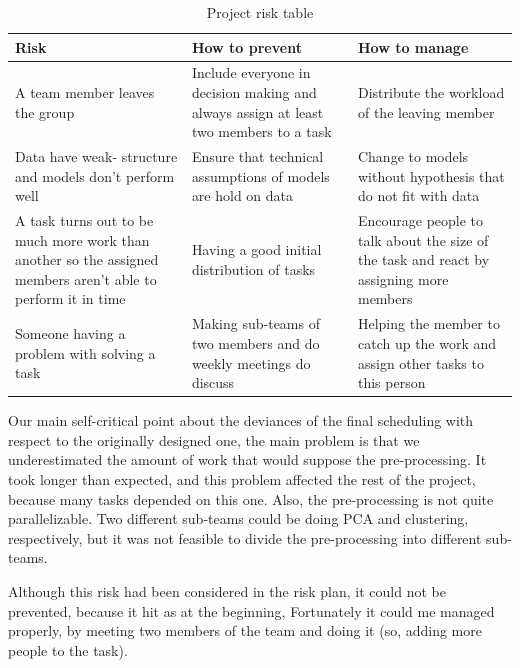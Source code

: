 \begin{table}[H]
\centering
\begin{tabular}{|p{}|p{}|p{}|}
\hline
Risk                                                   & How to prevent                                  & How to manage                                         \\ \hline

A team member leaves the group & Include everyone in decision making and always assign at least two members to a task & Distribute the workload of the leaving member \\ \hline

Data have weak- structure and models don't perform well & Ensure that technical assumptions of models are hold on data  & Change to models without hypothesis that do not fit with data \\ \hline

A task turns out to be much more work than another so the assigned members aren't able to perform it in time & Having a good initial distribution of tasks & Encourage people to talk about the size of the task and react by assigning more members \\ \hline
  
  
 Someone having a problem with solving a task& Making sub-teams of two members and do weekly meetings do discuss &  Helping the member to catch up the work and assign other tasks to this person \\ \hline

\end{tabular}
\caption{Project risk table}
\label{fig:riskTable}
\end{table}

Our main self-critical point about the deviances of the final scheduling with respect to the originally designed one, the main problem is that we underestimated the amount of work that would suppose the pre-processing. It took longer than expected, and this problem affected the rest of the project, because many tasks depended on this one. Also, the pre-processing is not quite parallelizable. Two different sub-teams could be doing PCA and clustering, respectively, but it was not feasible to divide the pre-processing into different sub-teams.

Although this risk had been considered in the risk plan, it could not be prevented, because it hit as at the beginning, Fortunately it could me managed properly, by meeting two members of the team and doing it (so, adding more people to the task).
